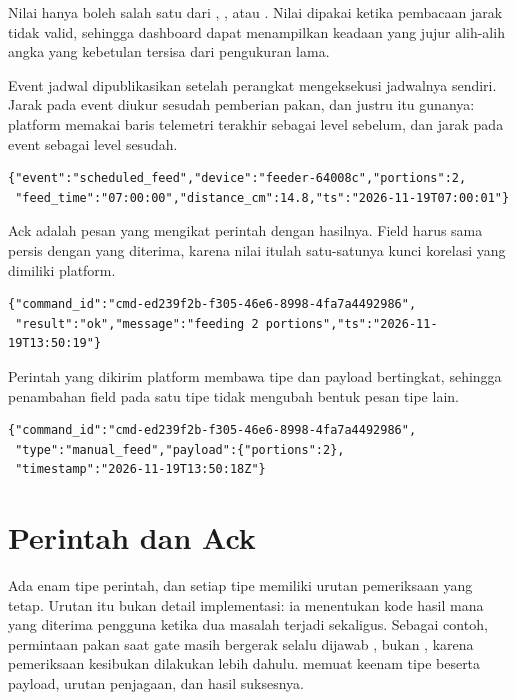 Nilai  hanya boleh salah satu dari , , atau
. Nilai  dipakai ketika pembacaan jarak tidak valid,
sehingga dashboard dapat menampilkan keadaan yang jujur alih-alih angka yang
kebetulan tersisa dari pengukuran lama.

Event jadwal dipublikasikan setelah perangkat mengeksekusi jadwalnya sendiri.
Jarak pada event diukur sesudah pemberian pakan, dan justru itu gunanya: platform
memakai baris telemetri terakhir sebagai level sebelum, dan jarak pada event
sebagai level sesudah.

\begin{lstlisting}[style=report]
{"event":"scheduled_feed","device":"feeder-64008c","portions":2,
 "feed_time":"07:00:00","distance_cm":14.8,"ts":"2026-11-19T07:00:01"}
\end{lstlisting}

Ack adalah pesan yang mengikat perintah dengan hasilnya. Field 
harus sama persis dengan yang diterima, karena nilai itulah satu-satunya kunci
korelasi yang dimiliki platform.

\begin{lstlisting}[style=report]
{"command_id":"cmd-ed239f2b-f305-46e6-8998-4fa7a4492986",
 "result":"ok","message":"feeding 2 portions","ts":"2026-11-19T13:50:19"}
\end{lstlisting}

Perintah yang dikirim platform membawa tipe dan payload bertingkat, sehingga
penambahan field pada satu tipe tidak mengubah bentuk pesan tipe lain.

\begin{lstlisting}[style=report]
{"command_id":"cmd-ed239f2b-f305-46e6-8998-4fa7a4492986",
 "type":"manual_feed","payload":{"portions":2},
 "timestamp":"2026-11-19T13:50:18Z"}
\end{lstlisting}

\section{Perintah dan Ack}

Ada enam tipe perintah, dan setiap tipe memiliki urutan pemeriksaan yang tetap.
Urutan itu bukan detail implementasi: ia menentukan kode hasil mana yang diterima
pengguna ketika dua masalah terjadi sekaligus. Sebagai contoh, permintaan pakan
saat gate masih bergerak selalu dijawab , bukan
, karena pemeriksaan kesibukan dilakukan lebih dahulu.
 memuat keenam tipe beserta payload, urutan penjagaan, dan
hasil suksesnya.

